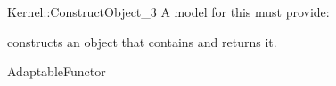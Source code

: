 \begin{ccRefFunctionObjectConcept}{Kernel::ConstructObject_3}
A model for this must provide:


{constructs an object that contains  and returns it.}

\ccRefines
AdaptableFunctor

\ccSeeAlso
{} \\
 \\
 \\
 \\
 \\
 \\

\end{ccRefFunctionObjectConcept}
